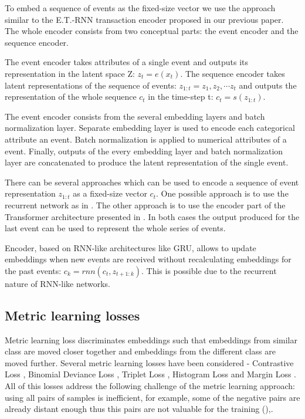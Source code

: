 \documentclass[sigconf]{acmart}
\begin{document}
To embed a sequence of events as the fixed-size vector we use the approach similar to the E.T.-RNN\cite{10.1145/3292500.3330693} transaction encoder proposed in our previous paper. The whole encoder consists from two conceptual parts: the event encoder and the sequence encoder.

The event encoder takes attributes of a single event and outputs its representation in the latent space Z: $z_t = e(x_t)$. The sequence encoder takes latent representations of the sequence of events: $ z_{1:t} = z_1, z_2, \cdots z_t $ and outputs the representation of the whole sequence $c_t$ in the time-step t: $ c_t = s(z_{1:t}) $.

The event encoder consists from the several embedding layers and batch normalization \cite{10.5555/3045118.3045167} layer. Separate embedding layer is used to encode each categorical attribute an event. Batch normalization is applied to numerical attributes of a event. Finally, outputs of the every embedding layer and batch normalization layer are concatenated to produce the latent representation of the single event.

There can be several approaches which can be used to encode a sequence of event representation $z_{1:t}$ as a fixed-size vector $c_t$. One possible approach is to use the recurrent network as in \cite{Sutskever:2014:SSL:2969033.2969173}. The other approach is to use the encoder part of the Transformer architecture presented in \cite{DBLP:journals/corr/VaswaniSPUJGKP17}. In both cases the output produced for the last event can be used to represent the whole series of events.

Encoder, based on RNN-like architectures like GRU, allows to update embeddings when new events are received without recalculating embeddings for the past events: $c_k = rnn(c_t, z_{t+1:k})$. This is possible due to the recurrent nature of RNN-like networks.

\subsection{Metric learning losses} \label{sec-ml-loss}

Metric learning loss discriminates embeddings such that embeddings from similar class are moved closer together and embeddings from the different class are moved further. Several metric learning losses have been considered - Contrastive Loss \cite{Hadsell:2006:DRL:1153171.1153654}, Binomial Deviance Loss \cite{Yi:2014:LUE:1407.4979}, Triplet Loss \cite{Hoffer:2015:LUE:1412.6622}, Histogram Loss \cite{histogram-loss} and Margin Loss \cite{wu2017sampling}. All of this losses address the following challenge of the metric learning approach: using all pairs of samples is inefficient, for example, some of the negative pairs are already distant enough thus this pairs are not valuable for the training ()\cite{Schroff2015FaceNetAU},.
\end{document}
